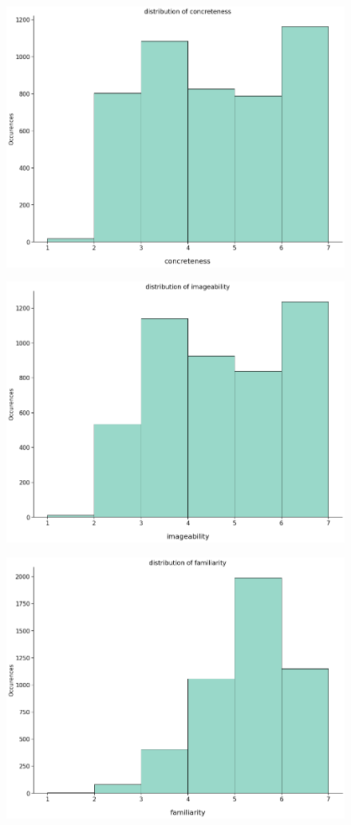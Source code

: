 \documentclass[a4paper,11pt,dvipsnames]{article}
\begin{document}
\begin{figure}[ht]
\begin{minipage}[b]{.3\linewidth}
\centering\large \includegraphics[width=0.9\linewidth]{Graphs/concreteness_distribution.png}
\label{fig:condis}
\end{minipage}%
\begin{minipage}[b]{.3\linewidth}
\centering\includegraphics[width=0.9\linewidth]{Graphs/imageability_distribution.png}\label{fig:imadis}
\end{minipage}
\begin{minipage}[b]{.3\linewidth}
\centering\includegraphics[width=0.9\linewidth]{Graphs/familiarity_distribution.png}\label{fig:famdis}

\end{minipage}
\end{figure}
\end{document}
